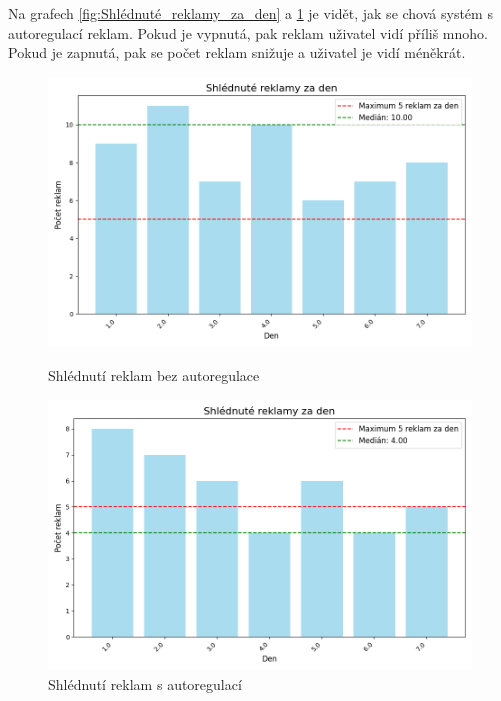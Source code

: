 \documentclass[11pt, a4paper]{article}
\begin{document}
Na grafech \ref{fig:Shlédnuté_reklamy_za_den} a \ref{fig:Shlédnuté_reklamy_za_den_auto} je vidět, jak se chová systém s autoregulací reklam.
Pokud je vypnutá, pak reklam uživatel vidí příliš mnoho. Pokud je zapnutá, pak se počet reklam snižuje a uživatel je vidí méněkrát.
\begin{figure}[h]
    \centering
    \begin{minipage}{0.49\linewidth}
        \centering
        \includegraphics[width=\linewidth]{Shlédnuté_reklamy_za_den.png}
        \caption{Shlédnutí reklam bez autoregulace}
        \label{fig:Shlédnuté_reklamy_za_den}
    \end{minipage}
    \hfill
    \begin{minipage}{0.49\linewidth}
        \centering
        \includegraphics[width=\linewidth]{Shlédnuté_reklamy_za_den_auto.png}
        \caption{Shlédnutí reklam s autoregulací}
        \label{fig:Shlédnuté_reklamy_za_den_auto}
    \end{minipage}
\end{figure}
\newpage
\end{document}

